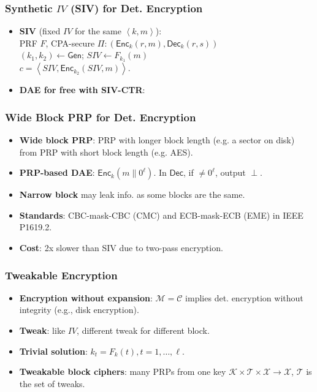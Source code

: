 \begin{frame}\frametitle{Synthetic $IV$ (SIV) for Det. Encryption}
\begin{itemize}
\item \textbf{SIV} (fixed $IV$ for the same $\left<k,m\right>$): \\
PRF $F$, CPA-secure $\Pi:(\mathsf{Enc}_k(r,m), \mathsf{Dec}_k(r,s))$\\ 
$(k_1,k_2) \gets \mathsf{Gen}$; $SIV \gets F_{k_1}(m)$\\ 
$c = \left<SIV,\mathsf{Enc}_{k_2}(SIV,m) \right>$.
\item \textbf{DAE for free with SIV-CTR}: %
\begin{figure}
\begin{center}

\end{center}
\end{figure}
\end{itemize}
\end{frame}
\begin{frame}\frametitle{Wide Block PRP for Det. Encryption}
\begin{itemize}
\item \textbf{Wide block PRP}: PRP with longer block length (e.g. a sector on disk) from PRP with short block length (e.g. AES).
\item \textbf{PRP-based DAE}: $\mathsf{Enc}_k(m\| 0^{\ell})$. In $\mathsf{Dec}$, if $\neq 0^{\ell}$, output $\perp$.
\item \textbf{Narrow block} may leak info. as some blocks are the same.
\item \textbf{Standards}: CBC-mask-CBC (CMC) and ECB-mask-ECB (EME) in IEEE P1619.2.
\item \textbf{Cost}: 2x slower than SIV due to two-pass encryption.
\end{itemize}
\end{frame}
\begin{frame}\frametitle{Tweakable Encryption}
\begin{itemize}
\item \textbf{Encryption without expansion}: $\mathcal{M} = \mathcal{C}$ implies det. encryption without integrity (e.g., disk encryption).
\item \textbf{Tweak}: like $IV$, different tweak for different block.
\item \textbf{Trivial solution}: $k_t = F_k(t), t=1,\dots,\ell.$
\item \textbf{Tweakable block ciphers}: many PRPs from one key $\mathcal{K} \times \mathcal{T} \times \mathcal{X} \to \mathcal{X}$, $\mathcal{T}$ is the set of tweaks.
\end{itemize}
\end{frame}
